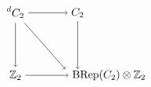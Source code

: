 \[
    \begin{tikzpicture}
        \node (A) at (0, 2) {$\prescript{d}{}{C_2}$};
        \node (B) at (0, 0) {$\mathbb{Z}_2$};
        \node (C) at (2, 2) {$C_2$};
        \node[right] (D) at (1.7, 0) {$\text{BRep}(C_2) \otimes \mathbb{Z}_2$};
        \draw[->] (A) -- (1.6, 0.2);
        \draw[->] (A) -- (C);
        \draw[->] (A) -- (B);
        \draw[->] (B) -- (D);
        \draw[->] (C) -- (2, 0.2);
    \end{tikzpicture}
\]
